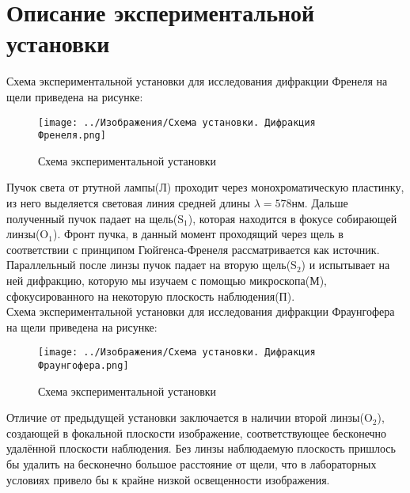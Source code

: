 \section*{Описание экспериментальной установки}

Схема экспериментальной установки для исследования дифракции 
Френеля на щели приведена на рисунке:

\begin{figure}[H]
	\centering
	\texttt{[image: ../Изображения/Схема
	 установки. Дифракция Френеля.png]}
	\caption{Схема экспериментальной установки}
\end{figure}

Пучок света от ртутной лампы(Л) проходит через 
монохроматическую пластинку, из него выделяется световая 
линия средней длины $\lambda = 578 нм$. Дальше полученный 
пучок падает на щель(S$_1$), которая находится в фокусе 
собирающей линзы(O$_1$). Фронт пучка, в данный момент 
проходящий через щель в соответствии с принципом 
Гюйгенса-Френеля рассматривается как источник. Параллельный 
после линзы пучок падает на вторую щель(S$_2$) и испытывает 
на ней дифракцию, которую мы изучаем с помощью микроскопа(М), 
сфокусированного на некоторую плоскость наблюдения(П).\\

Схема экспериментальной установки для исследования дифракции 
Фраунгофера на щели приведена на рисунке:

\begin{figure}[H]
	\centering
	\texttt{[image: ../Изображения/Схема
	 установки. Дифракция Фраунгофера.png]}
	\caption{Схема экспериментальной установки}
\end{figure}

Отличие от предыдущей установки заключается в наличии второй 
линзы(O$_2$), создающей в фокальной плоскости изображение, 
соответствующее бесконечно удалённой плоскости наблюдения. 
Без линзы наблюдаемую плоскость пришлось бы удалить на 
бесконечно большое расстояние от щели, что в лабораторных 
условиях привело бы к крайне низкой освещенности изображения.